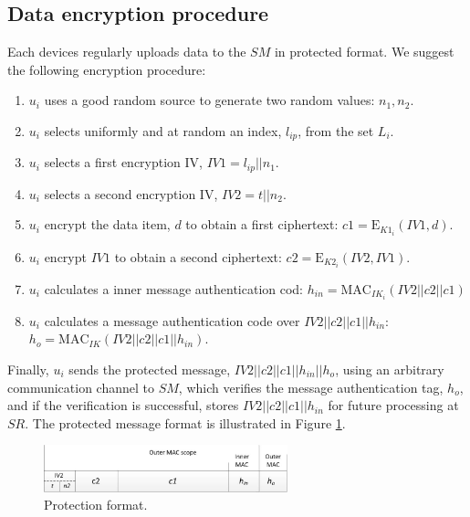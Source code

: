 {\subsection{Data encryption procedure}
\label{dataprotection:encryption}
Each devices regularly uploads data to the $SM$ in protected format. We suggest the following encryption procedure:
\begin{enumerate}
    \item $u_i$ uses a good random source to generate two random values: $n_1,n_2$.
    \item $u_i$ selects uniformly and at random an index, $l_{ip}$, from the set $L_i$.
    \item $u_i$ selects a first encryption IV, $IV1 = l_{ip}||n_1$.
    \item $u_i$ selects a second encryption IV, $IV2 = t||n_2$.
    \item $u_i$ encrypt the data item, $d$ to obtain a first ciphertext: $c1 = \text{E}_{K1_i}(IV1,d)$.
    \item $u_i$ encrypt $IV1$ to obtain a second ciphertext: $c2= \text{E}_{K2_i}(IV2,IV1)$.
    \item $u_i$ calculates a inner message authentication cod: $h_{in} = \text{MAC}_{IK_i}(IV2||c2||c1)$
    \item $u_i$ calculates a message authentication code over $IV2||c2||c1||h_{in}$: $h_o = \text{MAC}_{IK}(IV2||c2||c1||h_{in})$.
\end{enumerate}
Finally, $u_i$ sends the protected message, $IV2||c2||c1||h_{in}||h_o$, using an arbitrary communication channel to $SM$, which verifies the message authentication tag, $h_o$, and if the verification is successful, stores $IV2||c2||c1||h_{in}$ for future processing at $SR$. The protected message format is illustrated in Figure \ref{fig:protection}.
\begin{figure}[ht]
    \centering
    \includegraphics[width=200pt]{papers/ppiot/images/ProtectionFormat}
    \caption{Protection format.}
    \label{fig:protection}
\end{figure}
}

